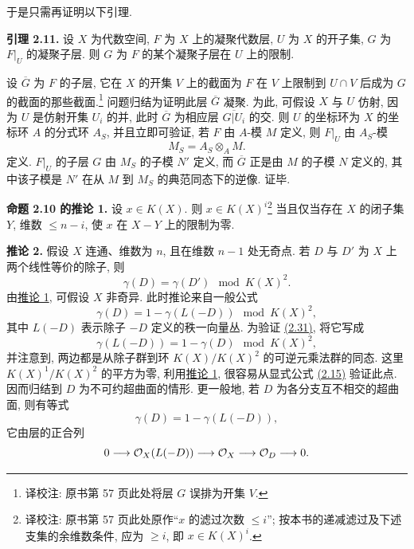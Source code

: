 于是只需再证明以下引理.

\textbf{引理 2.11.} 设 $X$ 为代数空间, $F$ 为 $X$ 上的凝聚代数层, $U$ 为 $X$ 的开子集, $G$ 为 $F|_U$ 的凝聚子层. 则 $G$ 为 $F$ 的某个凝聚子层在 $U$ 上的限制.

设 $\overline G$ 为 $F$ 的子层, 它在 $X$ 的开集 $V$ 上的截面为 $F$ 在 $V$ 上限制到 $U\cap V$ 后成为 $G$ 的截面的那些截面.\footnote{译校注: 原书第 57 页此处将层 $G$ 误排为开集 $V$.} 问题归结为证明此层 $\overline G$ 凝聚. 为此, 可假设 $X$ 与 $U$ 仿射, 因为 $U$ 是仿射开集 $U_i$ 的并, 此时 $\overline G$ 为相应层 $\overline{G|U_i}$ 的交. 则 $U$ 的坐标环为 $X$ 的坐标环 $A$ 的分式环 $A_S$, 并且立即可验证, 若 $F$ 由 $A$-模 $M$ 定义, 则 $F|_U$ 由 $A_S$-模
\[
 M_S=A_S\otimes_A M.
\]
定义. $F|_U$ 的子层 $G$ 由 $M_S$ 的子模 $N'$ 定义, 而 $\overline G$ 正是由 $M$ 的子模 $N$ 定义的, 其中该子模是 $N'$ 在从 $M$ 到 $M_S$ 的典范同态下的逆像. 证毕.

\textbf{命题 2.10 的推论 1.} 设 $x\in K(X)$. 则 $x\in K(X)^i$\footnote{译校注: 原书第 57 页此处原作“$x$ 的滤过次数 $\leq i$”; 按本书的递减滤过及下述支集的余维数条件, 应为 $\geq i$, 即 $x\in K(X)^i$.} 当且仅当存在 $X$ 的闭子集 $Y$, 维数 $\leq n-i$, 使 $x$ 在 $X-Y$ 上的限制为零.

\textbf{推论 2.} 假设 $X$ 连通、维数为 $n$, 且在维数 $n-1$ 处无奇点. 若 $D$ 与 $D'$ 为 $X$ 上两个线性等价的除子, 则
\[
 \gamma(D)=\gamma(D')\mod K(X)^2.
\]
由\hyperlink{sga6.e00.cor.1}{推论 1}, 可假设 $X$ 非奇异. 此时推论来自一般公式
\begin{equation}\tag{2.31}
 \gamma(D)=1-\gamma(L(-D))\mod K(X)^2,
\end{equation}
其中 $L(-D)$ 表示除子 $-D$ 定义的秩一向量丛. 为验证 \hyperlink{sga6.e00.eq.2-31}{(2.31)}, 将它写成
\begin{equation}\tag{2.31 bis}
 \gamma(L(-D))=1-\gamma(D)\mod K(X)^2,
\end{equation}
并注意到, 两边都是从除子群到环 $K(X)/K(X)^2$ 的可逆元乘法群的同态. 这里 $K(X)^1/K(X)^2$ 的平方为零, 利用\hyperlink{sga6.e00.cor.1}{推论 1}, 很容易从显式公式 \hyperlink{sga6.e00.eq.2-15}{(2.15)} 验证此点. 因而归结到 $D$ 为不可约超曲面的情形. 更一般地, 若 $D$ 为各分支互不相交的超曲面, 则有等式
\begin{equation}\tag{2.32}
 \gamma(D)=1-\gamma(L(-D)),
\end{equation}
它由层的正合列
\[
0\longrightarrow \mathcal O_X(L(-D))\longrightarrow \mathcal O_X\longrightarrow \mathcal O_D\longrightarrow 0.
\]


